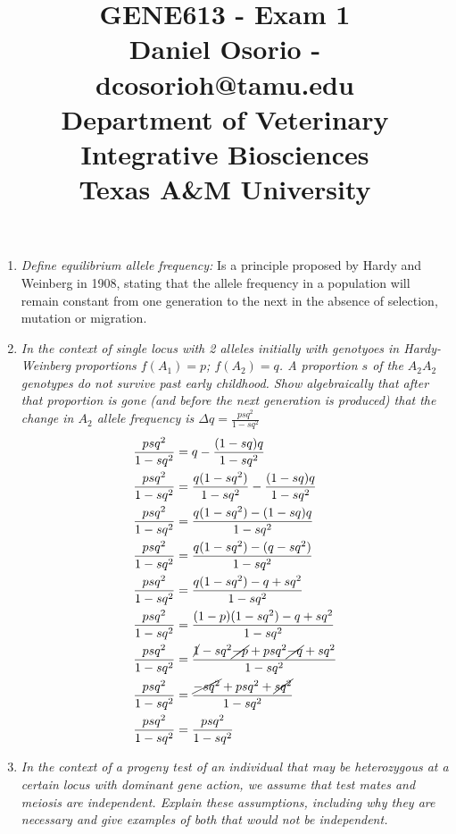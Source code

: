 \documentclass[12pt,a4paper]{paper}
\begin{document}
\title{GENE613 - Exam 1\\\small{Daniel Osorio - dcosorioh@tamu.edu\\Department of Veterinary Integrative Biosciences\\Texas A\&M University}}
\maketitle

\begin{enumerate}
\item \emph{Define equilibrium allele frequency:}
Is a principle proposed by Hardy and Weinberg in 1908, stating that the allele frequency in a population will remain constant from one generation to the next in the absence of selection, mutation or migration.
\item \emph{In the context of single locus with 2 alleles initially with genotyoes in Hardy-Weinberg proportions $f(A_{1})=p$; $f(A_{2})=q$. A proportion $s$ of the $A_{2}A_{2}$ genotypes do not survive past early childhood. Show algebraically that after that proportion is gone (and before the next generation is produced) that the change in $A_{2}$ allele frequency is $\Delta q = \frac{psq^{2}}{1-sq^{2}}$}
\begin{equation}
\begin{split}
\frac{psq^{2}}{1-sq^{2}} &= q - \frac{(1-sq)q}{1-sq^{2}}\\
\frac{psq^{2}}{1-sq^{2}} &= \frac{q(1-sq^{2})}{1-sq^{2}} - \frac{(1-sq)q}{1-sq^{2}}\\
\frac{psq^{2}}{1-sq^{2}} &= \frac{q(1-sq^{2}) - (1-sq)q}{1-sq^{2}}\\
\frac{psq^{2}}{1-sq^{2}} &= \frac{q(1-sq^{2}) - (q - sq^{2})}{1-sq^{2}}\\
\frac{psq^{2}}{1-sq^{2}} &= \frac{q(1-sq^{2}) - q + sq^{2}}{1-sq^{2}}\\
\frac{psq^{2}}{1-sq^{2}} &= \frac{(1-p)(1-sq^{2}) - q + sq^{2}}{1-sq^{2}}\\
\frac{psq^{2}}{1-sq^{2}} &= \frac{\cancel{1}-sq^{2} \cancel{- p}  + psq^{2} \cancel{- q} + sq^{2}}{1-sq^{2}}\\
\frac{psq^{2}}{1-sq^{2}} &= \frac{\cancel{-sq^{2}}   + psq^{2}  + \cancel{sq^{2}}}{1-sq^{2}}\\
\frac{psq^{2}}{1-sq^{2}} &= \frac{psq^{2}}{1-sq^{2}}\\
\end{split}
\end{equation}
\item \emph{In the context of a progeny test of an individual that may be heterozygous at a certain locus with dominant gene action, we assume that test mates and meiosis are independent. Explain these assumptions, including why they are necessary and give examples of both that would not be independent.}

\end{enumerate}
\end{document}
